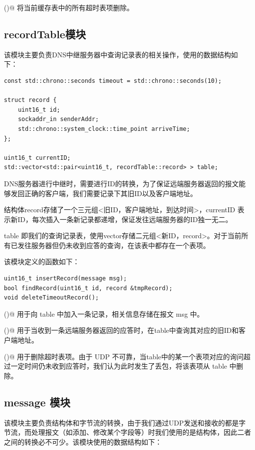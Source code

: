 \documentclass[]{article}
\begin{document}
        \verb@clearTimeoutItem()@ 将当前缓存表中的所有超时表项删除。

    \subsection{recordTable模块}
        该模块主要负责DNS中继服务器中查询记录表的相关操作，使用的数据结构如下：
        \begin{lstlisting}
const std::chrono::seconds timeout = std::chrono::seconds(10);            

struct record {
    uint16_t id;
    sockaddr_in senderAddr;
    std::chrono::system_clock::time_point arriveTime;
};

uint16_t currentID;
std::vector<std::pair<uint16_t, recordTable::record> > table;
        \end{lstlisting}
        
        DNS服务器进行中继时，需要进行ID的转换，为了保证远端服务器返回的报文能够发回正确的客户端，我们需要记录下其旧ID以及客户端地址。

        结构体record存储了一个三元组<旧ID，客户端地址，到达时间>，currentID 表示新ID，每次插入一条新记录都递增，保证发往远端服务器的ID独一无二。
        
        table 即我们的查询记录表，使用vector存储二元组<新ID，record>。对于当前所有已发往服务器但仍未收到应答的查询，在该表中都存在一个表项。

        该模块定义的函数如下：

        \begin{lstlisting}
uint16_t insertRecord(message msg);
bool findRecord(uint16_t id, record &tmpRecord);
void deleteTimeoutRecord();
        \end{lstlisting}

        \verb@insertRecord()@ 用于向 table 中加入一条记录，相关信息存储在报文 msg 中。

        \verb@findRecord()@ 用于当收到一条远端服务器返回的应答时，在table中查询其对应的旧ID和客户端地址。

        \verb@deleteTimeoutRecord()@ 用于删除超时表项。由于 UDP 不可靠，当table中的某一个表项对应的询问超过一定时间仍未收到应答时，我们认为此时发生了丢包，将该表项从 table 中删除。

    \subsection{message 模块}
        该模块主要负责结构体和字节流的转换，由于我们通过UDP发送和接收的都是字节流，而处理报文（如添加、修改某个字段等）时我们使用的是结构体，因此二者之间的转换必不可少。该模块使用的数据结构如下：
\end{document}
